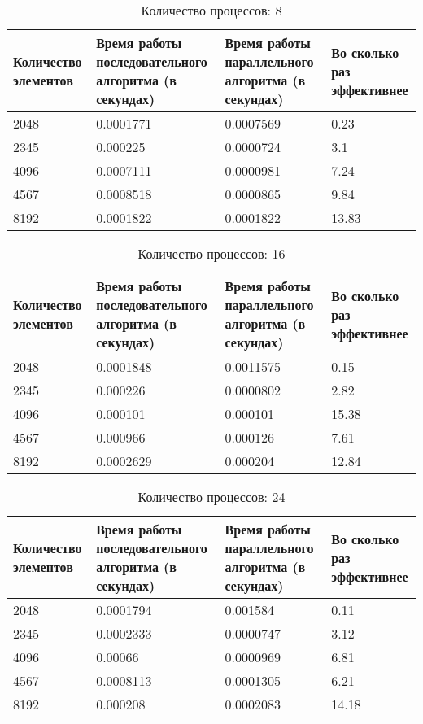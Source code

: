 \documentclass{report}
\begin{document}
\begin{table}[h]
  \caption{Количество процессов: 8}
  \centering
\begin{tabular}{| p{2cm} | p{3cm} | p{4cm} | p{2cm} |}
\hline
Количество элементов & Время работы последовательного алгоритма (в секундах) & Время работы параллельного алгоритма (в секундах) & Во сколько раз эффективнее  \\[5pt]
\hline
2048        & 0.0001771      & 0.0007569     & 0.23      \\
2345      & 0.000225       & 0.0000724     & 3.1       \\
4096        & 0.0007111        & 0.0000981      & 7.24       \\
4567        & 0.0008518        & 0.0000865     & 9.84      \\
8192        & 0.0001822        & 0.0001822     & 13.83       \\
\hline
\end{tabular}
\end{table}

\begin{table}[h]
  \caption{Количество процессов: 16}
  \centering
\begin{tabular}{| p{2cm} | p{3cm} | p{4cm} | p{2cm} |}
\hline
Количество элементов & Время работы последовательного алгоритма (в секундах) & Время работы параллельного алгоритма (в секундах) & Во сколько раз эффективнее  \\[5pt]
\hline
2048        & 0.0001848      & 0.0011575     & 0.15      \\
2345      & 0.000226       & 0.0000802     & 2.82       \\
4096        & 0.000101        & 0.000101      & 15.38       \\
4567        & 0.000966        & 0.000126     & 7.61      \\
8192        & 0.0002629        & 0.000204     & 12.84       \\
\hline
\end{tabular}
\end{table}

\begin{table}[h]
  \caption{Количество процессов: 24}
  \centering
\begin{tabular}{| p{2cm} | p{3cm} | p{4cm} | p{2cm} |}
\hline
Количество элементов & Время работы последовательного алгоритма (в секундах) & Время работы параллельного алгоритма (в секундах) & Во сколько раз эффективнее  \\[5pt]
\hline
2048        & 0.0001794      & 0.001584     & 0.11      \\
2345      & 0.0002333       & 0.0000747     & 3.12       \\
4096        & 0.00066        & 0.0000969      & 6.81       \\
4567        & 0.0008113        & 0.0001305     & 6.21      \\
8192        & 0.000208        & 0.0002083     & 14.18       \\
\hline
\end{tabular}
\end{table}
\end{document}
